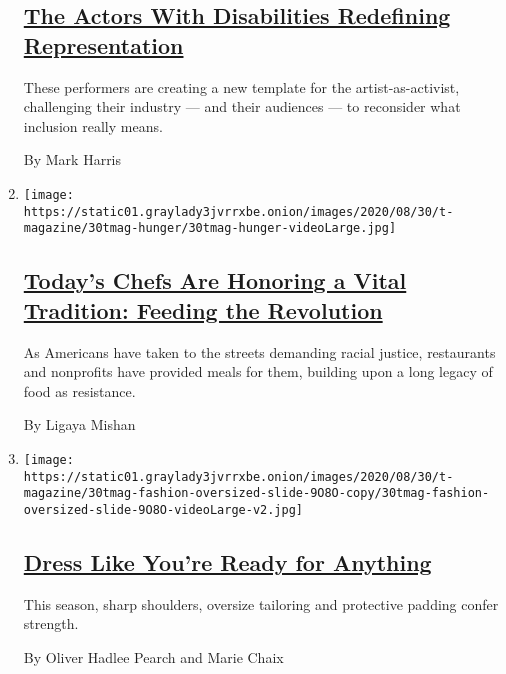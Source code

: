 \begin{enumerate}
  \hypertarget{the-actors-with-disabilities-redefining-representation}{%
  \subsection{\texorpdfstring{\href{/2020/08/25/t-magazine/actors-disability-theater-film-tv.html}{The
  Actors With Disabilities Redefining
  Representation}}{The Actors With Disabilities Redefining Representation}}\label{the-actors-with-disabilities-redefining-representation}}

  These performers are creating a new template for the
  artist-as-activist, challenging their industry --- and their audiences
  --- to reconsider what inclusion really means.

  By Mark Harris
\item
  \texttt{[image: https://static01.graylady3jvrrxbe.onion/images/2020/08/30/t-magazine/30tmag-hunger/30tmag-hunger-videoLarge.jpg]}

  \hypertarget{todays-chefs-are-honoring-a-vital-tradition-feeding-the-revolution}{%
  \subsection{\texorpdfstring{\href{/2020/08/28/t-magazine/food-protest-revolution.html}{Today's
  Chefs Are Honoring a Vital Tradition: Feeding the
  Revolution}}{Today's Chefs Are Honoring a Vital Tradition: Feeding the Revolution}}\label{todays-chefs-are-honoring-a-vital-tradition-feeding-the-revolution}}

  As Americans have taken to the streets demanding racial justice,
  restaurants and nonprofits have provided meals for them, building upon
  a long legacy of food as resistance.

  By Ligaya Mishan
\item
  \texttt{[image: https://static01.graylady3jvrrxbe.onion/images/2020/08/30/t-magazine/30tmag-fashion-oversized-slide-9O8O-copy/30tmag-fashion-oversized-slide-9O8O-videoLarge-v2.jpg]}

  \hypertarget{dress-like-youre-ready-for-anything}{%
  \subsection{\texorpdfstring{\href{/2020/08/25/t-magazine/fall-womens-fashion-sharp-oversize-tailoring.html}{Dress
  Like You're Ready for
  Anything}}{Dress Like You're Ready for Anything}}\label{dress-like-youre-ready-for-anything}}

  This season, sharp shoulders, oversize tailoring and protective
  padding confer strength.

  By Oliver Hadlee Pearch and Marie Chaix
\end{enumerate}

